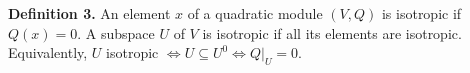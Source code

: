 \textbf{Definition 3.} An element $x$ of a quadratic module $(V,Q)$ is isotropic if $Q(x) = 0$. A subspace $U$ of $V$ is isotropic if all its elements are isotropic. Equivalently, $U$ isotropic $\iff U \subseteq U^0 \iff Q|_U = 0$.
